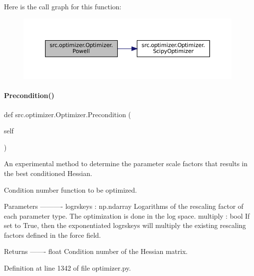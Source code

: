 Here is the call graph for this function\+:
\nopagebreak
\begin{figure}[H]
\begin{center}
\leavevmode
\includegraphics[width=350pt]{classsrc_1_1optimizer_1_1Optimizer_aba1d50ad4756203f83a5be844972f0a2_cgraph}
\end{center}
\end{figure}
\mbox{\label{classsrc_1_1optimizer_1_1Optimizer_a372e02cecc05914c0fea61baf5ea2b28}} 
\paragraph{\texorpdfstring{Precondition()}{Precondition()}}
{\footnotesize\ttfamily def src.\+optimizer.\+Optimizer.\+Precondition (\begin{DoxyParamCaption}\item[{}]{self }\end{DoxyParamCaption})}



An experimental method to determine the parameter scale factors that results in the best conditioned Hessian. 

Condition number function to be optimized. \begin{DoxyVerb}       Parameters
       ----------
       logrskeys : np.ndarray
           Logarithms of the rescaling factor of each parameter type.
           The optimization is done in the log space.
       multiply : bool
           If set to True, then the exponentiated logrskeys will
           multiply the existing rescaling factors defined in the force field.

       Returns
       -------
       float
           Condition number of the Hessian matrix.\end{DoxyVerb}
 

Definition at line 1342 of file optimizer.\+py.

